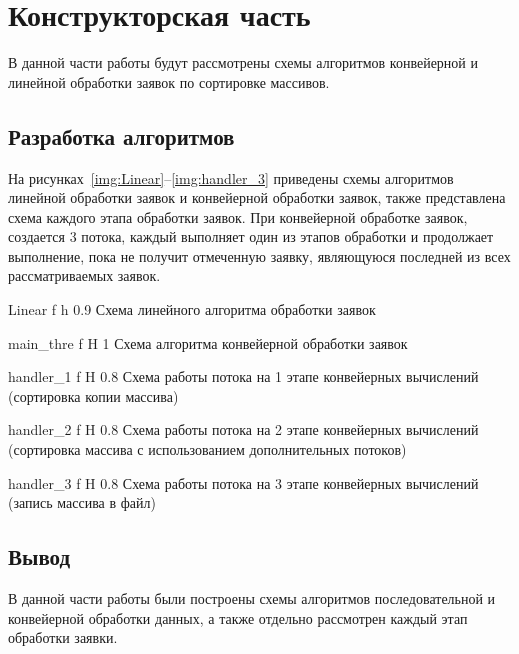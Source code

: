 \chapter{Конструкторская часть}
В данной части работы будут рассмотрены схемы алгоритмов конвейерной и линейной обработки заявок по сортировке массивов.







\section{Разработка алгоритмов}
На рисунках~\ref{img:Linear}--\ref{img:handler_3} приведены схемы алгоритмов линейной обработки заявок и конвейерной обработки заявок, также представлена схема каждого этапа обработки заявок.
При конвейерной обработке заявок, создается 3 потока, каждый выполняет один из этапов обработки и продолжает выполнение, пока не получит отмеченную заявку, являющуюся последней из всех рассматриваемых заявок.

{Linear} %
{f} %
{h} %
{0.9\textwidth} %
{Схема линейного алгоритма обработки заявок} %



{main_thre} %
{f} %
{H} %
{1\textwidth} %
{Схема алгоритма конвейерной обработки заявок} %


{handler_1} %
{f} %
{H} %
{0.8\textwidth} %
{Схема работы потока на 1 этапе конвейерных вычислений (сортировка копии массива)} %

{handler_2} %
{f} %
{H} %
{0.8\textwidth} %
{Схема работы потока на 2 этапе конвейерных вычислений (сортировка массива с использованием дополнительных потоков)} %

{handler_3} %
{f} %
{H} %
{0.8\textwidth} %
{Схема работы потока на 3 этапе конвейерных вычислений (запись массива в файл)} %






\section*{Вывод}
В данной части работы были построены схемы алгоритмов последовательной и конвейерной обработки данных, а также отдельно рассмотрен каждый этап обработки заявки.









